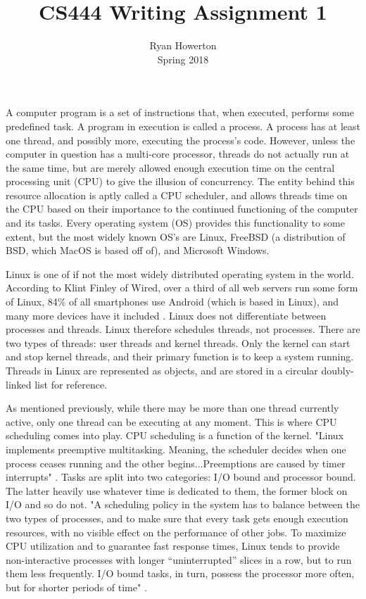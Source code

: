\documentclass[10pt,draftclsnofoot,onecolumn]{IEEEtran}
\title{CS444 Writing Assignment 1}
\author{Ryan Howerton \\ Spring 2018}
\begin{document}
	\maketitle
    \newpage
        A computer program is a set of instructions that, when executed, performs some predefined task. A program in execution is called a process. A process has at least one thread, and possibly more, executing the process's code. However, unless the computer in question has a multi-core processor, threads do not actually run at the same time, but are merely allowed enough execution time on the central processing unit (CPU) to give the illusion of concurrency. The entity behind this resource allocation is aptly called a CPU scheduler, and allows threads time on the CPU based on their importance to the continued functioning of the computer and its tasks. Every operating system (OS) provides this functionality to some extent, but the most widely known OS's are Linux, FreeBSD (a distribution of BSD, which MacOS is based off of), and Microsoft Windows.\par
        Linux is one of if not the most widely distributed operating system in the world. According to Klint Finley of Wired, over a third of all web servers run some form of Linux, 84\% of all smartphones use Android (which is based in Linux), and many more devices have it included \cite{finley_2017}. Linux does not differentiate between processes and threads. Linux therefore schedules threads, not processes. There are two types of threads: user threads and kernel threads. Only the kernel can start and stop kernel threads, and their primary function is to keep a system running. Threads in Linux are represented as objects, and are stored in a circular doubly-linked list for reference.\par
        As mentioned previously, while there may be more than one thread currently active, only one thread can be executing at any moment. This is where CPU scheduling comes into play. CPU scheduling is a function of the kernel. "Linux implements preemptive multitasking. Meaning, the scheduler decides when one process ceases running and the other begins...Preemptions are caused by timer interrupts" \cite{Ishkov_2015}. Tasks are split into two categories: I/O bound and processor bound. The latter heavily use whatever time is dedicated to them, the former block on I/O and so do not. "A scheduling policy in the system has to balance between the two types of processes, and to make sure that every task gets enough execution resources, with no visible effect on the performance of other jobs. To maximize CPU utilization and to guarantee fast response times, Linux tends to provide non-interactive processes with longer “uninterrupted” slices in a row, but to run them less frequently. I/O bound tasks, in turn, possess the processor more often, but for shorter periods of time" \cite{Ishkov_2015}.\par
\end{document}
